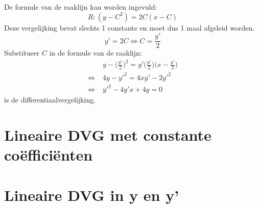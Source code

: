 {\begin{enumerate}
De formule van de raaklijn kan worden ingevuld:
$$R: (y - C^2) = 2C(x - C)$$
Deze vergelijking bevat slechts 1 constante en moet dus 1 maal afgeleid worden.
$$y' = 2C \Leftrightarrow C = \frac{y'}{2}$$
Substitueer $C$ in de formule van de raaklijn:
\begin{equation*}
\begin{split}
    & y - \bigg(\frac{y'}{2}\bigg)^2 = y'\bigg(\frac{y'}{2}\bigg)\bigg(x - \frac{y'}{2}\bigg) \\
    \Leftrightarrow \; & 4y - y'^2 = 4xy' - 2y'^2 \\
    \Leftrightarrow \; & y'^2 - 4y'x + 4y = 0
\end{split}
\end{equation*}
is de differentiaalvergelijking.
\end{enumerate}
}
\section{Lineaire DVG met constante coëfficiënten}

\section{Lineaire DVG in y en y'}

